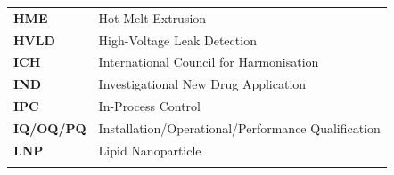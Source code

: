 \documentclass[
  11pt,
  a4paper,
]{report}
\begin{document}
\begin{longtable}[]{@{}ll@{}}
\begin{minipage}[t]{0.33\columnwidth}\raggedright
\textbf{HME}\strut
\end{minipage} & \begin{minipage}[t]{0.61\columnwidth}\raggedright
Hot Melt Extrusion\strut
\end{minipage}\tabularnewline
\begin{minipage}[t]{0.33\columnwidth}\raggedright
\textbf{HVLD}\strut
\end{minipage} & \begin{minipage}[t]{0.61\columnwidth}\raggedright
High-Voltage Leak Detection\strut
\end{minipage}\tabularnewline
\begin{minipage}[t]{0.33\columnwidth}\raggedright
\textbf{ICH}\strut
\end{minipage} & \begin{minipage}[t]{0.61\columnwidth}\raggedright
International Council for Harmonisation\strut
\end{minipage}\tabularnewline
\begin{minipage}[t]{0.33\columnwidth}\raggedright
\textbf{IND}\strut
\end{minipage} & \begin{minipage}[t]{0.61\columnwidth}\raggedright
Investigational New Drug Application\strut
\end{minipage}\tabularnewline
\begin{minipage}[t]{0.33\columnwidth}\raggedright
\textbf{IPC}\strut
\end{minipage} & \begin{minipage}[t]{0.61\columnwidth}\raggedright
In-Process Control\strut
\end{minipage}\tabularnewline
\begin{minipage}[t]{0.33\columnwidth}\raggedright
\textbf{IQ/OQ/PQ}\strut
\end{minipage} & \begin{minipage}[t]{0.61\columnwidth}\raggedright
Installation/Operational/Performance Qualification\strut
\end{minipage}\tabularnewline
\begin{minipage}[t]{0.33\columnwidth}\raggedright
\textbf{LNP}\strut
\end{minipage} & \begin{minipage}[t]{0.61\columnwidth}\raggedright
Lipid Nanoparticle\strut
\end{minipage}\tabularnewline
\begin{minipage}[t]{0.33\columnwidth}\raggedright

\end{minipage}
\end{longtable}
\end{document}
